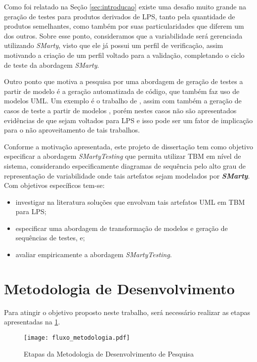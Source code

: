Como foi relatado na Seção \ref{sec:introducao}  existe uma desafio muito grande na geração de testes para produtos derivados de LPS, tanto pela quantidade de produtos semelhantes, como também por suas particularidades que diferem um dos outros. Sobre esse ponto, consideramos que a variabilidade será gerenciada utilizando \textit{SMarty}, visto que ele já possui um perfil de verificação, assim motivando a criação de um perfil voltado para a validação, completando o ciclo de teste da abordagem \textit{SMarty}.

Outro ponto que motiva a pesquisa por uma abordagem de geração de testes a partir de modelo é a geração automatizada de código, que também faz uso de modelos UML. Um exemplo é o trabalho de \citealp{kundu2013automatic}, assim com também a geração de casos de teste a partir de modelos \cite{panthi2013automatic,sarma2007automatic,sokenou2006generating}, porém nestes casos não são apresentados evidências de que sejam voltados para LPS e isso pode ser um fator de implicação para o não aproveitamento de tais trabalhos.

Conforme a motivação apresentada, este projeto de dissertação tem como objetivo especificar a abordagem \textit{SMartyTesting} que permita utilizar TBM em nível de sistema, considerando especificamente diagramas de sequência pelo alto grau de representação de variabilidade onde tais artefatos sejam modelados por \textbf{\textit{SMarty}}. Com objetivos específicos tem-se:

\begin{itemize}
	\item investigar na literatura soluções que envolvam tais artefatos UML em TBM para LPS;
	\item especificar uma abordagem de transformação de modelos e geração de sequências de testes, e;
	\item avaliar empiricamente a abordagem \textit{SMartyTesting}.
\end{itemize} 

\section{Metodologia de Desenvolvimento}
\label{sec:repres_e_fob}

Para atingir o objetivo proposto neste trabalho, será necessário realizar as etapas apresentadas na \ref{fig:fluxometodo}.

\begin{figure}[htb]
	\centering
	\texttt{[image: fluxo\_metodologia.pdf]}
	\caption{Etapas da Metodologia de Desenvolvimento de Pesquisa}
	\label{fig:fluxometodo}
\end{figure}

